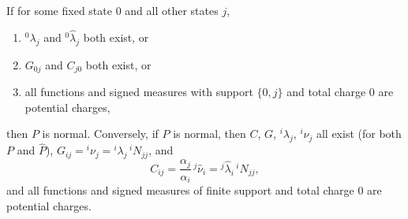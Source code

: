 If for some fixed state $0$ and all other states $j$,
\begin{enumerate}
\item[(1)] ${}^0\lambda_j$ and ${}^0\hat{\lambda}_j$ both exist, or
\item[(2)] $G_{0j}$ and $C_{j0}$ both exist, or
\item[(3)] all functions and signed measures with support $\{0, j\}$ and total charge $0$ are potential charges,
\end{enumerate}
then $P$ is normal. Conversely, if $P$ is normal, then $C$, $G$, ${}^i\lambda_j$, ${}^i\nu_j$ all exist (for both $P$ and $\hat{P}$), $G_{ij} = {}^i\nu_j = {}^i\lambda_j\,{}^iN_{jj}$, and
$$C_{ij} = \frac{\alpha_j}{\alpha_i}\,{}^j\hat{\nu}_i = {}^j\hat{\lambda}_i\,{}^iN_{jj},$$
and all functions and signed measures of finite support and total charge $0$ are potential charges.
